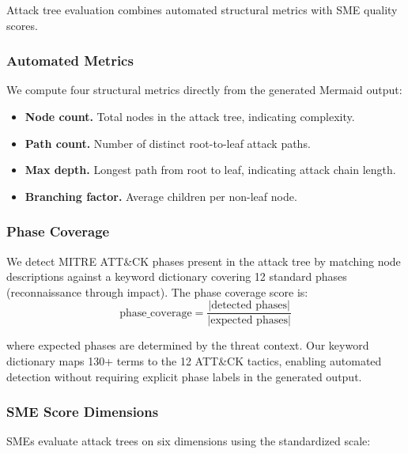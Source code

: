 Attack tree evaluation combines automated structural metrics with SME quality scores.

\subsubsection{Automated Metrics}

We compute four structural metrics directly from the generated Mermaid output:

\begin{itemize}
    \item \textbf{Node count.} Total nodes in the attack tree, indicating complexity.
    \item \textbf{Path count.} Number of distinct root-to-leaf attack paths.
    \item \textbf{Max depth.} Longest path from root to leaf, indicating attack chain length.
    \item \textbf{Branching factor.} Average children per non-leaf node.
\end{itemize}

\subsubsection{Phase Coverage}

We detect MITRE ATT\&CK phases present in the attack tree by matching node descriptions against a keyword dictionary covering 12 standard phases (reconnaissance through impact). The phase coverage score is:
\begin{equation}
\text{phase\_coverage} = \frac{|\text{detected phases}|}{|\text{expected phases}|}
\end{equation}

where expected phases are determined by the threat context. Our keyword dictionary maps 130+ terms to the 12 ATT\&CK tactics, enabling automated detection without requiring explicit phase labels in the generated output.

\subsubsection{SME Score Dimensions}

SMEs evaluate attack trees on six dimensions using the standardized scale:

